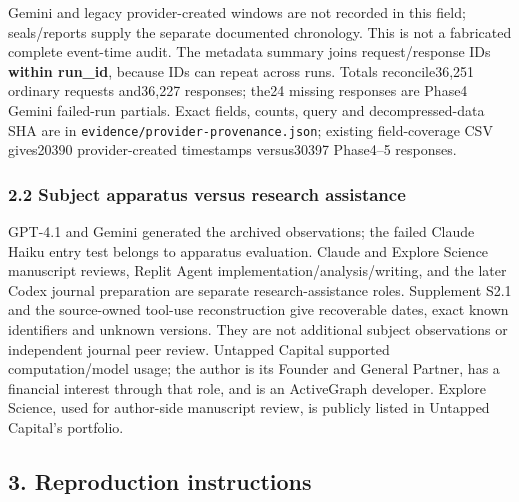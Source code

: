\documentclass[11pt]{article}
\begin{document}
Gemini and legacy provider-created windows are not recorded in this
field; seals/reports supply the separate documented chronology. This is
not a fabricated complete event-time audit. The metadata summary joins
request/response IDs \textbf{within run\_id}, because IDs can repeat
across runs. Totals reconcile36,251 ordinary requests and36,227
responses; the24 missing responses are Phase4 Gemini failed-run
partials. Exact fields, counts, query and decompressed-data SHA are in
\texttt{evidence/provider-provenance.json}; existing field-coverage CSV
gives20390 provider-created timestamps versus30397 Phase4--5 responses.

\subsubsection{2.2 Subject apparatus versus research
assistance}\label{subject-apparatus-versus-research-assistance}

GPT-4.1 and Gemini generated the archived observations; the failed
Claude Haiku entry test belongs to apparatus evaluation. Claude and
Explore Science manuscript reviews, Replit Agent
implementation/analysis/writing, and the later Codex journal preparation
are separate research-assistance roles. Supplement S2.1 and the
source-owned tool-use reconstruction give recoverable dates, exact known
identifiers and unknown versions. They are not additional subject
observations or independent journal peer review. Untapped Capital
supported computation/model usage; the author is its Founder and General
Partner, has a financial interest through that role, and is an
ActiveGraph developer. Explore Science, used for author-side manuscript
review, is publicly listed in Untapped Capital's portfolio.

\subsection{3. Reproduction
instructions}\label{reproduction-instructions}
\end{document}
